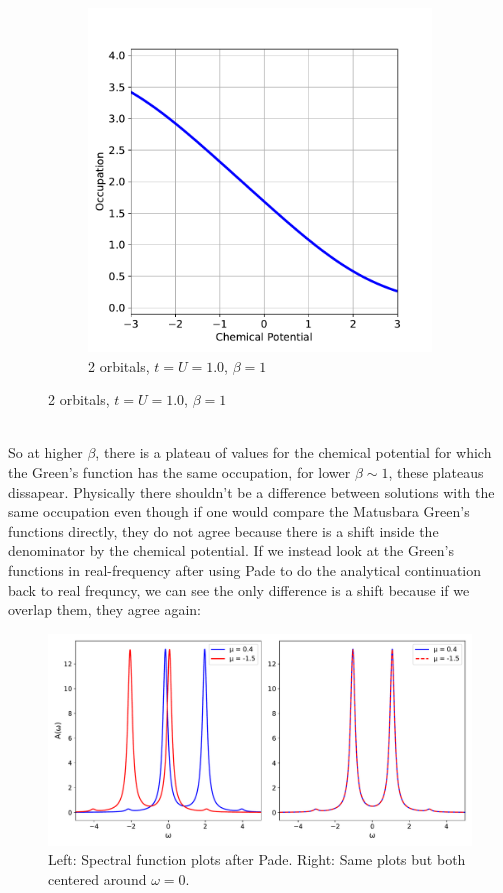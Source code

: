 \documentclass[12pt]{article}
\begin{document}
\begin{figure}[h!]
\begin{subfigure}[b]{0.45\textwidth}
    \includegraphics[width=\textwidth]{o21.pdf}
    \caption{2 orbitals, $t=U=1.0$, $\beta = 1$}
  \end{subfigure}
\end{figure}\\
So at higher $\beta$, there is a plateau of values for the chemical potential for which the Green's function has the same occupation, for lower $\beta\sim 1$, these plateaus dissapear. Physically there shouldn't be a difference between solutions with the same occupation even though if one would compare the Matusbara Green's functions directly, they do not agree because there is a shift inside the denominator by the chemical potential.
\newpage
\noindent
If we instead look at the Green's functions in real-frequency after using Pade to do the analytical continuation back to real frequncy, we can see the only difference is a shift because if we overlap them, they agree again:
\begin{figure}[h!]
\centering
\includegraphics[width=\textwidth]{spec.pdf}
\caption{Left: Spectral function plots after Pade. Right: Same plots but both centered around $\omega=0$.}
\end{figure}\\
\end{document}
